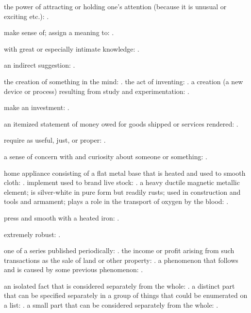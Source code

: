   the power of attracting or holding one's attention (because it is unusual or exciting etc.): .

  make sense of; assign a meaning to: .

  with great or especially intimate knowledge: .

  an indirect suggestion: .

  the creation of something in the mind: . the act of inventing: . a creation (a new device or process) resulting from study and experimentation: .

  make an investment: .

  an itemized statement of money owed for goods shipped or services rendered: .

  require as useful, just, or proper: .

  a sense of concern with and curiosity about someone or something: .

  home appliance consisting of a flat metal base that is heated and used to smooth cloth: . implement used to brand live stock: . a heavy ductile magnetic metallic element; is silver-white in pure form but readily rusts; used in construction and tools and armament; plays a role in the transport of oxygen by the blood: .

  press and smooth with a heated iron: .

  extremely robust: .

  one of a series published periodically: . the income or profit arising from such transactions as the sale of land or other property: . a phenomenon that follows and is caused by some previous phenomenon: .

  an isolated fact that is considered separately from the whole: . a distinct part that can be specified separately in a group of things that could be enumerated on a list: . a small part that can be considered separately from the whole: .

